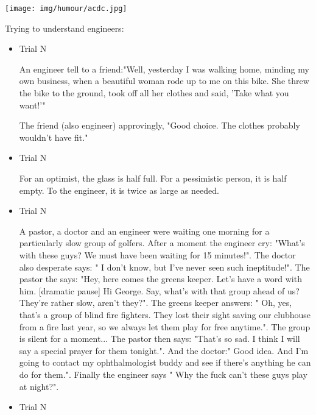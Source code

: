 	\begin{center}
	\texttt{[image: img/humour/acdc.jpg]}
	\end{center}

	\begin{center}\underline{\hspace{5 cm}}\end{center}

Trying to understand engineers:

\begin{itemize}

	\item Trial N

An engineer tell to a friend:"Well, yesterday I was walking home, minding my own business, when a beautiful woman rode up to me on this bike. She threw the bike to the ground, took off all her clothes and said, 'Take what you want!'"

The friend (also engineer) approvingly, "Good choice. The clothes probably wouldn't have fit."

	\item Trial N 

For an optimist, the glass is half full.
For a pessimistic person, it is half empty.
To the engineer, it is twice as large as needed.

	\item Trial N 

A pastor, a doctor and an engineer were waiting one morning for a particularly slow group of golfers. After a moment the engineer cry: "What's with these guys? We must have been waiting for 15 minutes!". The doctor also desperate says: " I don't know, but I've never seen such ineptitude!". The pastor the says: "Hey, here comes the greens keeper. Let's have a word with him. [dramatic pause] Hi George. Say, what's with that group ahead of us? They're rather slow, aren't they?". The greens keeper answers: " Oh, yes, that's a group of blind fire fighters. They lost their sight saving our clubhouse from a fire last year, so we always let them play for free anytime.". The group is silent for a moment... The pastor then says: "That's so sad. I think I will say a special prayer for them tonight.". And the doctor:" Good idea. And I'm going to contact my ophthalmologist buddy and see if there's anything he can do for them.". Finally the engineer says " Why the fuck can't these guys play at night?".

	\item Trial N 


\end{itemize}
